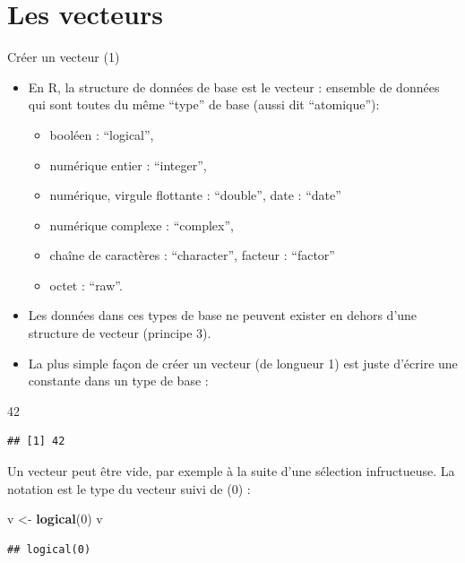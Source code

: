 \documentclass[
  ignorenonframetext,
]{beamer}
\newenvironment{Shaded}{\begin{snugshade}}{\end{snugshade}}
\newcommand{\DecValTok}[1]{\textcolor[rgb]{0.00,0.00,0.81}{#1}}
\newcommand{\FunctionTok}[1]{\textcolor[rgb]{0.13,0.29,0.53}{\textbf{#1}}}
\newcommand{\NormalTok}[1]{#1}
\newcommand{\OtherTok}[1]{\textcolor[rgb]{0.56,0.35,0.01}{#1}}
\providecommand{\tightlist}{%
  \setlength{\itemsep}{0pt}\setlength{\parskip}{0pt}}
\begin{document}
\hypertarget{les-vecteurs-1}{%
\section{Les vecteurs}\label{les-vecteurs-1}}

\begin{frame}[fragile]{Créer un vecteur (1)}
\protect\hypertarget{cruxe9er-un-vecteur-1}{}
\begin{itemize}
\tightlist
\item
  En R, la structure de données de base est le vecteur : ensemble de
  données qui sont toutes du même ``type'' de base (aussi dit
  ``atomique''):

  \begin{itemize}
  \tightlist
  \item
    booléen : ``logical'',
  \item
    numérique entier : ``integer'',
  \item
    numérique, virgule flottante : ``double'', date : ``date''
  \item
    numérique complexe : ``complex'',
  \item
    chaîne de caractères : ``character'', facteur : ``factor''
  \item
    octet : ``raw''.
  \end{itemize}
\item
  Les données dans ces types de base ne peuvent exister en dehors d'une
  structure de vecteur (principe 3).
\item
  La plus simple façon de créer un vecteur (de longueur 1) est juste
  d'écrire une constante dans un type de base :
\end{itemize}

\tiny

\begin{Shaded}
\begin{Highlighting}[]
\DecValTok{42}
\end{Highlighting}
\end{Shaded}

\begin{verbatim}
## [1] 42
\end{verbatim}

\normalsize Un vecteur peut être vide, par exemple à la suite d'une
sélection infructueuse. La notation est le type du vecteur suivi de (0)
:

\tiny

\begin{Shaded}
\begin{Highlighting}[]
\NormalTok{v }\OtherTok{\textless{}{-}} \FunctionTok{logical}\NormalTok{(}\DecValTok{0}\NormalTok{)}
\NormalTok{v}
\end{Highlighting}
\end{Shaded}

\begin{verbatim}
## logical(0)
\end{verbatim}

\normalsize
\end{frame}
\end{document}
